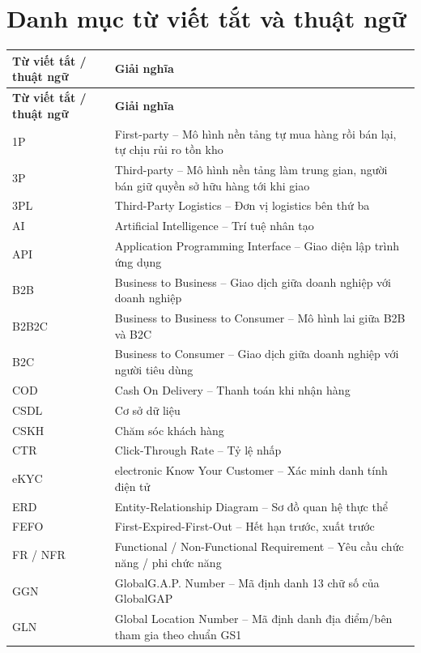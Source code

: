 \chapter*{Danh mục từ viết tắt và thuật ngữ}

\begingroup
\small
\renewcommand{\arraystretch}{1.1}
\setlength{\tabcolsep}{5pt}
\begin{longtable}{L{3.4cm} L{12cm}}
\toprule
{}
\textbf{Từ viết tắt / thuật ngữ} & \textbf{Giải nghĩa} \\
\midrule
\endfirsthead
\toprule
{}
\textbf{Từ viết tắt / thuật ngữ} & \textbf{Giải nghĩa} \\
\midrule
\endhead
\bottomrule
\endfoot
1P & First-party -- Mô hình nền tảng tự mua hàng rồi bán lại, tự chịu rủi ro tồn kho \\
3P & Third-party -- Mô hình nền tảng làm trung gian, người bán giữ quyền sở hữu hàng tới khi giao \\
3PL & Third-Party Logistics -- Đơn vị logistics bên thứ ba \\
AI & Artificial Intelligence -- Trí tuệ nhân tạo \\
API & Application Programming Interface -- Giao diện lập trình ứng dụng \\
B2B & Business to Business -- Giao dịch giữa doanh nghiệp với doanh nghiệp \\
B2B2C & Business to Business to Consumer -- Mô hình lai giữa B2B và B2C \\
B2C & Business to Consumer -- Giao dịch giữa doanh nghiệp với người tiêu dùng \\
COD & Cash On Delivery -- Thanh toán khi nhận hàng \\
CSDL & Cơ sở dữ liệu \\
CSKH & Chăm sóc khách hàng \\
CTR & Click-Through Rate -- Tỷ lệ nhấp \\
eKYC & electronic Know Your Customer -- Xác minh danh tính điện tử \\
ERD & Entity-Relationship Diagram -- Sơ đồ quan hệ thực thể \\
FEFO & First-Expired-First-Out -- Hết hạn trước, xuất trước \\
FR / NFR & Functional / Non-Functional Requirement -- Yêu cầu chức năng / phi chức năng \\
GGN & GlobalG.A.P. Number -- Mã định danh 13 chữ số của GlobalGAP \\
GLN & Global Location Number -- Mã định danh địa điểm/bên tham gia theo chuẩn GS1 \\

\end{longtable}
